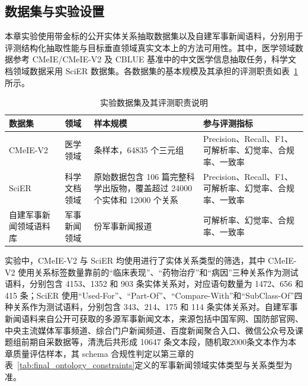 \subsection{数据集与实验设置}

本章实验使用带金标的公开实体关系抽取数据集以及自建军事新闻语料，分别用于评测结构化抽取性能与目标垂直领域真实文本上的方法可用性。其中，医学领域数据参考 CMeIE/CMeIE-V2 及 CBLUE 基准中的中文医学信息抽取任务\cite{Guan2020CMeIE,Zhang2022CBLUE}，科学文档领域数据采用 SciER 数据集\cite{Zhang2024SciER}。各数据集的基本规模及其承担的评测职责如表~\ref{tab:exp_datasets_eval_roles}所示。

\begin{table}[htbp]
  \centering
  \caption{实验数据集及其评测职责说明}
  \label{tab:exp_datasets_eval_roles}
  {\renewcommand{\arraystretch}{1.18}
  \small
  \setlength{\tabcolsep}{3pt}
  \begin{tabularx}{0.98\textwidth}{
    >{\raggedright\arraybackslash}p{}
    >{\raggedright\arraybackslash}p{}
    >{\raggedright\arraybackslash}p{}
    >{\raggedright\arraybackslash}X
  }
    \toprule
    数据集 & 领域 & 样本规模 & 参与评测指标 \\
    \midrule
    CMeIE-V2
    & 医学领域
    & 14339 条样本，64835 个三元组
    & Precision、Recall、F1、可解析率、幻觉率、合规率、一致率 \\

    SciER
    & 科学文档领域
    & 原始数据包含 106 篇完整科学出版物，覆盖超过 24000 个实体和 12000 个关系
    & Precision、Recall、F1、可解析率、幻觉率、合规率、一致率 \\

    自建军事新闻领域语料库
    & 军事新闻领域
    & 10647 份军事新闻报道
    & 可解析率、幻觉率、合规率、一致率 \\
    \bottomrule
  \end{tabularx}}
\end{table}

实验中，CMeIE-V2 与 SciER 均使用进行了实体关系类型的筛选，其中 CMeIE-V2 使用关系标签数量靠前的“临床表现”、“药物治疗”和“病因”三种关系作为测试语料，分别包含 4153、1352 和 903 条实体关系对，对应语句数量为 1472、656 和 415 条；SciER 使用“Used-For”、“Part-Of”、“Compare-With”和“SubClass-Of”四种关系作为测试语料，分别包含 343、214、175 和 114 条实体关系对。自建军事新闻语料来自公开可获取的多源军事新闻文本，来源包括中国军网、国防部官网、中央主流媒体军事频道、综合门户新闻频道、百度新闻聚合入口、微信公众号及课题组前期自采数据等，清洗后共形成 10647 条文本段，随机取2000条文本作为本章质量评估样本，其 schema 合规性判定以第三章的表~\ref{tab:final_ontology_constraints}定义的军事新闻领域实体类型与关系类型为准。


